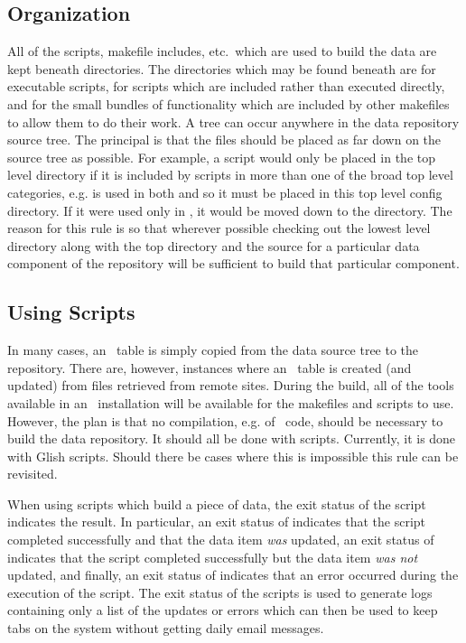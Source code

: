 \subsection*{Organization}
All of the scripts, makefile includes, etc.~which are used to build the data
are kept beneath  directories. The directories which may be
found beneath  are  for executable scripts,
 for scripts which are included rather than executed directly,
and  for the small bundles of functionality which are
included by other makefiles to allow them to do their work. A 
tree can occur anywhere in the data repository source tree. The principal
is that the  files should be placed as far down on the
source tree as possible. For example, a script would only be placed in
the top level  directory if it is included
by scripts in more than one of the broad top level categories, e.g.
 is used in both  and
 so it must be placed in this top level config directory.
If it were used only in , it would be moved down to
the  directory. The reason for this
rule is so that wherever possible checking out the lowest level 
directory along with the top  directory and the source for a
particular data component of the repository will be sufficient to build
that particular component.

\subsection*{Using Scripts}
In many cases, an \aipspp\ table is simply copied from the data source
tree to the repository. There are, however, instances where an
\aipspp\ table is created (and updated) from files retrieved from remote sites.
During the build, all of the tools available in an \aipspp\ installation
will be available for the makefiles and scripts to use. However,
the plan is that no compilation, e.g. of \cplusplus\ code, should be
necessary to build the data repository. It should all be done with
scripts. Currently, it is done with Glish scripts. Should there be
cases where this is impossible this rule can be revisited.

When using scripts which build a piece of data, the exit status
of the script indicates the result. In particular, an exit status
of  indicates that the script completed successfully and
that the data item \textit{was} updated, an exit status of 
indicates that the script completed successfully but the data item
\textit{was not} updated, and finally, an exit status of 
indicates that an error occurred during the execution of the script.
The exit status of the scripts is used to generate logs containing
only a list of the updates or errors which can then be used to keep
tabs on the system without getting daily email messages.


